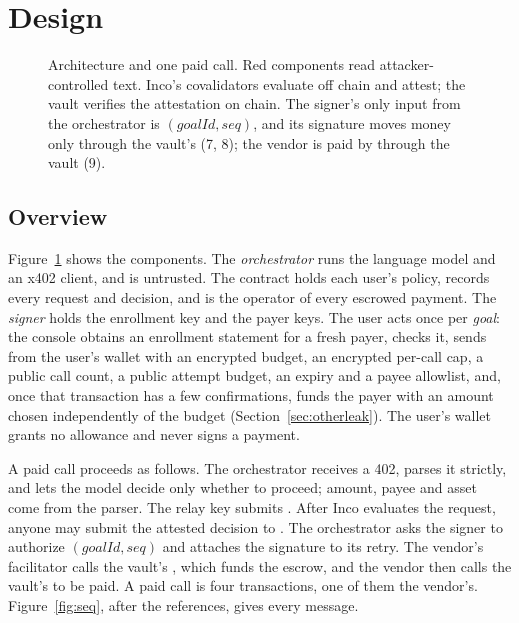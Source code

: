 \section{Design}
\label{sec:design}

\begin{figure}[t]
\centering
\resizebox{\linewidth}{!}{}
\caption{Architecture and one paid call. Red components read attacker-controlled text. Inco's covalidators
evaluate off chain and attest; the vault verifies the attestation on chain. The signer's only input from the
orchestrator is $(\mathit{goalId}, \mathit{seq})$, and its signature moves money only through the vault's
 (7, 8); the vendor is paid by  through the vault (9).}
\label{fig:arch}
\end{figure}

\subsection{Overview}

Figure~\ref{fig:arch} shows the components. The \emph{orchestrator} runs the language model and an x402
client, and is untrusted. The  contract holds each user's policy, records every
request and decision, and is the operator of every escrowed payment. The \emph{signer} holds the enrollment
key and the payer keys. The user acts once per \emph{goal}: the console obtains an enrollment statement for a
fresh payer, checks it, sends  from the user's wallet with an encrypted budget, an
encrypted per-call cap, a public call count, a public attempt budget, an expiry and a payee allowlist, and,
once that transaction has a few confirmations, funds the payer with an amount chosen independently of the
budget (Section~\ref{sec:otherleak}). The user's wallet grants no allowance and never signs a payment.

A paid call proceeds as follows. The orchestrator receives a 402, parses it strictly, and lets the model decide
only whether to proceed; amount, payee and asset come from the parser. The relay key submits
. After Inco
evaluates the request, anyone may submit the attested decision to . The orchestrator
asks the signer to authorize $(\mathit{goalId}, \mathit{seq})$ and attaches the signature to its retry. The
vendor's facilitator calls the vault's , which funds the escrow, and the vendor then calls the
vault's  to be paid. A paid call is four transactions, one of them the vendor's.
Figure~\ref{fig:seq}, after the references, gives every message.

